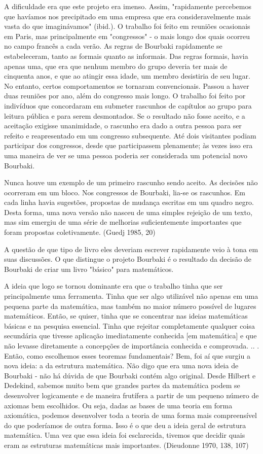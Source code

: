 \documentclass[12pt]{article}
\begin{document}
A dificuldade era que este projeto era imenso. Assim, "rapidamente percebemos que havíamos nos precipitado em uma empresa que era consideravelmente mais vasta do que imaginávamos" (ibid.). O trabalho foi feito em reuniões ocasionais em Paris, mas principalmente em "congressos" - o mais longo dos quais ocorreu no campo francês a cada verão. As regras de Bourbaki rapidamente se estabeleceram, tanto as formais quanto as informais. Das regras formais, havia apenas uma, que era que nenhum membro do grupo deveria ter mais de cinquenta anos, e que ao atingir essa idade, um membro desistiria de seu lugar. No entanto, certos comportamentos se tornaram convencionais. Passou a haver duas reuniões por ano, além do congresso mais longo. O trabalho foi feito por indivíduos que concordaram em submeter rascunhos de capítulos ao grupo para leitura pública e para serem desmontados. Se o resultado não fosse aceito, e a aceitação exigisse unanimidade, o rascunho era dado a outra pessoa para ser refeito e reapresentado em um congresso subsequente. Até dois visitantes podiam participar dos congressos, desde que participassem plenamente; às vezes isso era uma maneira de ver se uma pessoa poderia ser considerada um potencial novo Bourbaki.

Nunca houve um exemplo de um primeiro rascunho sendo aceito. As decisões não ocorreram em um bloco. Nos congressos de Bourbaki, lia-se os rascunhos. Em cada linha havia sugestões, propostas de mudança escritas em um quadro negro. Desta forma, uma nova versão não nasceu de uma simples rejeição de um texto, mas sim emergiu de uma série de melhorias suficientemente importantes que foram propostas coletivamente. (Guedj 1985, 20)

A questão de que tipo de livro eles deveriam escrever rapidamente veio à tona em suas discussões. O que distingue o projeto Bourbaki é o resultado da decisão de Bourbaki de criar um livro "básico" para matemáticos.

A ideia que logo se tornou dominante era que o trabalho tinha que ser principalmente uma ferramenta. Tinha que ser algo utilizável não apenas em uma pequena parte da matemática, mas também no maior número possível de lugares matemáticos. Então, se quiser, tinha que se concentrar nas ideias matemáticas básicas e na pesquisa essencial. Tinha que rejeitar completamente qualquer coisa secundária que tivesse aplicação imediatamente conhecida [em matemática] e que não levasse diretamente a concepções de importância conhecida e comprovada. .. . Então, como escolhemos esses teoremas fundamentais? Bem, foi aí que surgiu a nova ideia: a da estrutura matemática. Não digo que era uma nova ideia de Bourbaki - não há dúvida de que Bourbaki contém algo original. Desde Hilbert e Dedekind, sabemos muito bem que grandes partes da matemática podem se desenvolver logicamente e de maneira frutífera a partir de um pequeno número de axiomas bem escolhidos. Ou seja, dadas as bases de uma teoria em forma axiomática, podemos desenvolver toda a teoria de uma forma mais compreensível do que poderíamos de outra forma. Isso é o que deu a ideia geral de estrutura matemática. Uma vez que essa ideia foi esclarecida, tivemos que decidir quais eram as estruturas matemáticas mais importantes. (Dieudonne 1970, 138, 107)
\end{document}
